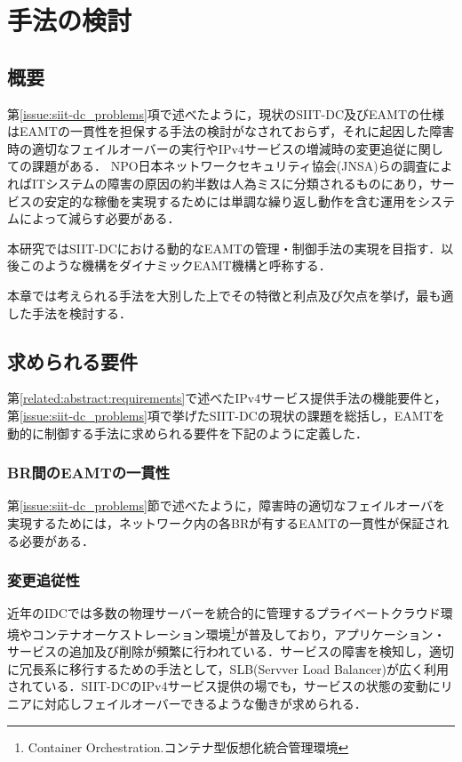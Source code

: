 \chapter{手法の検討}
\label{consideration}

\section{概要}
第\ref{issue:siit-dc_problems}項で述べたように，現状のSIIT-DC及びEAMTの仕様はEAMTの一貫性を担保する手法の検討がなされておらず，それに起因した障害時の適切なフェイルオーバーの実行やIPv4サービスの増減時の変更追従に関しての課題がある．
NPO日本ネットワークセキュリティ協会(JNSA)らの調査によればITシステムの障害の原因の約半数は人為ミスに分類されるものにあり\cite{human_error}，サービスの安定的な稼働を実現するためには単調な繰り返し動作を含む運用をシステムによって減らす必要がある．

本研究ではSIIT-DCにおける動的なEAMTの管理・制御手法の実現を目指す．以後このような機構をダイナミックEAMT機構と呼称する．

本章では考えられる手法を大別した上でその特徴と利点及び欠点を挙げ，最も適した手法を検討する．


\section{求められる要件}
\label{consideration:points}

第\ref{related:abstract:requirements}で述べたIPv4サービス提供手法の機能要件と，第\ref{issue:siit-dc_problems}項で挙げたSIIT-DCの現状の課題を総括し，EAMTを動的に制御する手法に求められる要件を下記のように定義した．

\subsection{BR間のEAMTの一貫性}
第\ref{issue:siit-dc_problems}節で述べたように，障害時の適切なフェイルオーバを実現するためには，ネットワーク内の各BRが有するEAMTの一貫性が保証される必要がある．

\subsection{変更追従性}
近年のIDCでは多数の物理サーバーを統合的に管理するプライベートクラウド環境やコンテナオーケストレーション環境\footnote{Container Orchestration.コンテナ型仮想化統合管理環境}が普及しており，アプリケーション・サービスの追加及び削除が頻繁に行われている．サービスの障害を検知し，適切に冗長系に移行するための手法として，SLB(Servver Load Balancer)が広く利用されている．SIIT-DCのIPv4サービス提供の場でも，サービスの状態の変動にリニアに対応しフェイルオーバーできるような働きが求められる．

